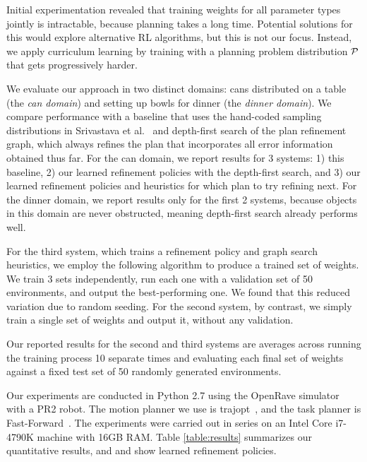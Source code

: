 Initial experimentation revealed that training weights for all parameter types jointly is intractable,
because planning takes a long time. Potential solutions for this would explore alternative RL algorithms,
but this is not our focus. Instead, we apply curriculum learning by training with a planning problem distribution
$\mathcal{P}$ that gets progressively harder.

We evaluate our approach in two distinct domains: cans distributed on a table (the \emph{can domain})
and setting up bowls for dinner (the \emph{dinner domain}).
We compare performance with a baseline that uses the hand-coded sampling distributions
in Srivastava et al.~\cite{srivastava2014combined} and depth-first search of the
plan refinement graph, which always refines the plan that incorporates all error information obtained
thus far. For the can domain, we report results for 3 systems: 1) this baseline, 2) our learned refinement policies
with the depth-first search, and 3) our learned refinement policies and heuristics for which
plan to try refining next. For the dinner domain, we report results only for the first 2 systems, because objects
in this domain are never obstructed, meaning depth-first search already performs well.

For the third system, which trains a refinement policy and graph search heuristics, we employ the following
algorithm to produce a trained set of weights. We train 3 sets independently, run each
one with a validation set of 50 environments, and output the best-performing one. We found that this
reduced variation due to random seeding. For the second system, by contrast, we simply train a single
set of weights and output it, without any validation.

Our reported results for the second and third systems are averages across running the training process 10 separate times
and evaluating each final set of weights against a fixed test set of 50 randomly generated environments.

Our experiments are conducted in Python 2.7 using the OpenRave simulator~\cite{Diankov_2008_6117} with a PR2 robot.
The motion planner we use is trajopt~\cite{schulman2013finding}, and the task planner is Fast-Forward~\cite{FF}.
The experiments were carried out in series on an Intel Core i7-4790K machine with 16GB RAM.
Table \ref{table:results} summarizes our quantitative results, and  and 
show learned refinement policies.

